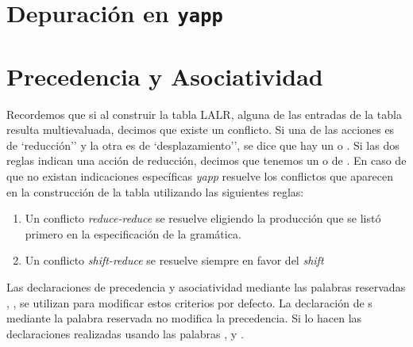 \section{Depuración en {\tt yapp}}
\label{section:depuracion}

\section{Precedencia y Asociatividad}
\label{section:prioridades}
Recordemos que si al construir la tabla LALR,
alguna de las entradas de la tabla resulta multievaluada, decimos
que existe un conflicto.
Si una de las acciones es de `reducción'' y la otra es de
`desplazamiento'', se dice que hay un  o
. Si las
dos reglas indican una acción de reducción, decimos que tenemos un 
 o de .
En caso de que no existan indicaciones específicas \emph{yapp} resuelve
los conflictos que aparecen en la construcción de la tabla utilizando
las siguientes reglas:

\begin{enumerate}
\item
Un conflicto \emph{reduce-reduce} se resuelve eligiendo la producción
que se listó primero en la especificación de la gramática.
\item
Un conflicto \emph{shift-reduce} se resuelve siempre en favor del \emph{shift}
\end{enumerate}

Las declaraciones de precedencia y asociatividad mediante las
palabras reservadas , , 
se utilizan para modificar estos criterios por defecto. 
La declaración de s mediante la palabra
reservada  no modifica la precedencia. Si lo hacen las
declaraciones realizadas usando las palabras , 
y . 

